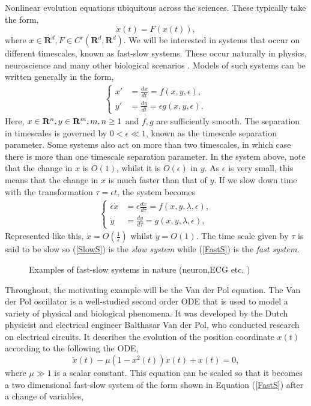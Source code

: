 Nonlinear evolution equations ubiquitous across the sciences. These typically take the form,
$$ \dot{x}(t) = F\left(x(t)\right),$$ where $x\in \mathbf{R}^d, F\in C^r(\mathbf{R}^d,\mathbf{R}^d)$. We will be interested in systems that occur on different timescales, known as fast-slow systems. These occur naturally in physics, neuroscience and many other biological scenarios \citep{Fitzhugh,Nagumo,Vanderpol}. Models of such systems can be written generally in the form,
\begin{align}
\begin{cases}
x' &=\frac{dx}{dt}= f(x,y,\epsilon),\\
y' &= \frac{dy}{dt}= \epsilon g(x,y,  \epsilon),
\end{cases}\label{FastS}
\end{align} 
Here, $x \in \mathbf{R}^n, y \in \mathbf{R}^m, m,n \geq 1$ and $f,g$ are sufficiently smooth. The separation in timescales is governed by $0<\epsilon \ll 1$, known as the timescale separation parameter. Some systems also act on more than two timescales, in which case there is more than one timescale separation parameter.  In the system above, note that the change in $x$ is $O(1)$, whilst it is $O(\epsilon)$ in $y$. As $\epsilon$ is very small, this means that the change in $x$ is much faster than that of $y$. If we slow down time with the transformation $\tau = \epsilon t$, the system becomes  
\begin{align}
	\begin{cases}
	\epsilon \dot{x} &= \epsilon \frac{dx}{d\tau} = f(x,y,\lambda, \epsilon),\\
	\dot{y} & = \frac{dy}{d \tau} =  g( x,y, \lambda, \epsilon),
	\end{cases}\label{SlowS}
\end{align} 
Represented like this, $\dot{x} = O(\frac{1}{\epsilon})$ whilst $\dot{y} = O(1)$.  The time scale given by $\tau$ is said to be slow so (\ref{SlowS}) is the \emph{slow system} while (\ref{FastS}) is the \emph{fast system}.\\


\begin{figure}[h]
	\caption{Examples of fast-slow systems in nature (neuron,ECG etc. )}
	\label{fig:nature}
\end{figure} 


Throughout, the motivating example will be the Van der Pol equation. The Van der Pol oscillator is a well-studied second order ODE that is used to model a variety of physical and biological phenomena. It was developed by the Dutch physicist and electrical engineer Balthasar Van der Pol, who conducted research on electrical circuits. It describes the evolution of the position coordinate \(x(t)\) according to the following the ODE,
\begin{equation} \label{eq:vdP}
\ddot{x}(t)-\mu\left(1-x^2(t)\right)\dot{x}(t)+x(t)=0,
\end{equation}
where \(\mu \gg 1\) is a scalar constant. This equation can be scaled so that it becomes a two dimensional fast-slow system of the form shown in Equation (\ref{FastS}) after a change of variables,

